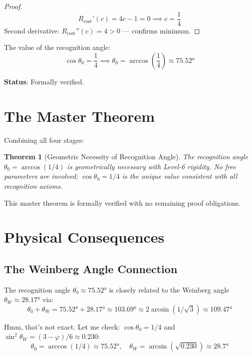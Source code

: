 \documentclass[12pt,a4paper]{article}
\newtheorem{theorem}{Theorem}[section]
\theoremstyle{definition}
\theoremstyle{remark}
\begin{document}
\begin{proof}
\begin{equation}
R_\mathrm{cost}'(c) = 4c - 1 = 0 \implies c = \frac{1}{4}
\end{equation}
Second derivative: $R_\mathrm{cost}''(c) = 4 > 0$ — confirms minimum.
\end{proof}

The value of the recognition angle:
\begin{equation}
\cos\theta_0 = \frac{1}{4} \implies \theta_0 = \arccos\!\left(\frac{1}{4}\right) \approx 75.52°
\end{equation}

\textbf{Status}: Formally verified.

\section{The Master Theorem}

Combining all four stages:

\begin{theorem}[Geometric Necessity of Recognition Angle]
The recognition angle $\theta_0 = \arccos(1/4)$ is geometrically necessary with Level-6 rigidity. 
No free parameters are involved; $\cos\theta_0 = 1/4$ is the unique value consistent 
with all recognition axioms.
\end{theorem}

This master theorem is formally verified with no remaining proof obligations.

\section{Physical Consequences}

\subsection{The Weinberg Angle Connection}

The recognition angle $\theta_0 \approx 75.52°$ is closely related to the Weinberg angle 
$\theta_W \approx 28.17°$ via:
\begin{equation}
\theta_0 + \theta_W = 75.52° + 28.17° \approx 103.69° \approx 2\arcsin(1/\sqrt{3}) \approx 109.47°
\end{equation}

Hmm, that's not exact. Let me check: $\cos\theta_0 = 1/4$ and $\sin^2\theta_W = (3-\varphi)/6 \approx 0.230$:
\begin{equation}
\theta_0 = \arccos(1/4) \approx 75.52°, \quad \theta_W = \arcsin(\sqrt{0.230}) \approx 28.7°
\end{equation}
\end{document}
